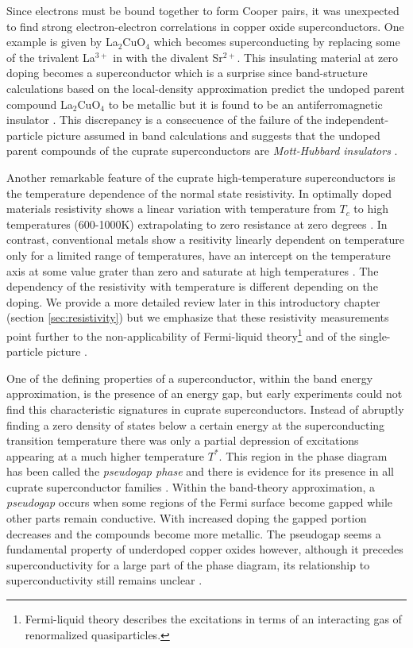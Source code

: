 Since electrons must be bound together to form Cooper pairs, it was unexpected to find strong electron-electron correlations in copper oxide superconductors. 
One example is given by La$_2$CuO$_4$ which becomes superconducting by replacing some of the trivalent La$^{3+}$ in with the divalent Sr$^{2+}$. 
This insulating material at zero doping becomes a superconductor which is a surprise since band-structure calculations based on the local-density approximation predict the undoped parent compound La$_2$CuO$_4$ to be metallic but it is found to be an antiferromagnetic insulator \cite{Timusk1999}.
This discrepancy is a consecuence of the failure of the independent-particle picture assumed in band calculations and suggests that the undoped parent compounds of the cuprate superconductors are \textit{Mott-Hubbard insulators} \cite{Mott1949}.

Another remarkable feature of the cuprate high-temperature superconductors is the temperature dependence of the normal state resistivity.
In optimally doped materials resistivity shows a linear variation with temperature from $T_c$ to high temperatures (600-1000K) extrapolating to zero resistance at zero degrees \cite{Gurvitch1987}.
In contrast, conventional metals show a resitivity linearly dependent on temperature only for a limited range of temperatures, have an intercept on the temperature axis at some value grater than zero and saturate at high temperatures \cite{Timusk1999}.
The dependency of the resistivity with temperature is different depending on the doping. 
We provide a more detailed review later in this introductory chapter (section \ref{sec:resistivity}) but we emphasize that these resistivity measurements point further to the non-applicability of Fermi-liquid theory\footnote{Fermi-liquid theory describes the excitations in terms of an interacting gas of renormalized quasiparticles.} and of the single-particle picture \cite{Orenstein2000}.

One of the defining properties of a superconductor, within the band energy approximation, is the presence of an energy gap, but early experiments could not find this characteristic signatures in cuprate superconductors.
Instead of abruptly finding a zero density of states below a certain energy at the superconducting transition temperature there was only a partial depression of excitations appearing at a much higher temperature $T^*$.
This region in the phase diagram has been called the \textit{pseudogap phase} and there is evidence for its presence in all cuprate superconductor families \cite{Timusk1999,Muller2007}.
Within the band-theory approximation, a \textit{pseudogap} occurs when some regions of the Fermi surface become gapped while other parts remain conductive. 
With increased doping the gapped portion decreases and the compounds become more metallic. 
The pseudogap seems a fundamental property of underdoped copper oxides however, although it precedes superconductivity for a large part of the phase diagram, its relationship to superconductivity still remains unclear \cite{Basov2005}.

